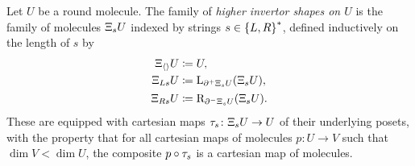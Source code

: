 \begin{dfn} 
    Let \( U \) be a round molecule.
    The family of \emph{higher invertor shapes on \( U \)} is the family of molecules \( \Xi_{s} U \) indexed by strings \( s \in \left\{ {L, R} \right\}^* \), defined inductively on the length of \( s \) by
    \begin{align*}
        \Xi_{\langle\rangle} U & \coloneqq U, \\
        \Xi_{Ls} U &\coloneqq \mathrm{L}_{\partial_{}^{+} \Xi_{s} U} (\Xi_{s} U), \\
                \Xi_{Rs} U &\coloneqq \mathrm{R}_{\partial_{}^{-} \Xi_{s} U} (\Xi_{s} U).
    \end{align*}
	These are equipped with cartesian maps \( \tau_s \colon \Xi_{s} U \to U \) of their underlying posets, with the property that for all cartesian maps of molecules \( p \colon U \to V \) such that \( \dim V < \dim U \), the composite \( p \circ \tau_s \) is a cartesian map of molecules.
\end{dfn}

